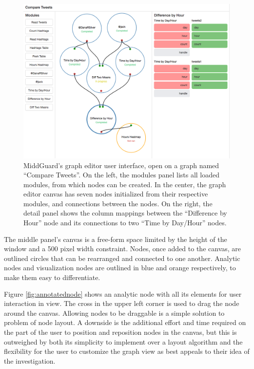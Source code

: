 \documentclass[midd]{thesis}
\begin{document}
\begin{figure}[!ht]
  \centering
  \includegraphics[width=1\textwidth]{compare-tweets-graph-editor-no-sidebar}
  \caption[MiddGuard's graph editor user interface.]{MiddGuard's graph editor
  user interface, open on a graph named ``Compare Tweets''. On the left, the
  modules panel lists all loaded modules, from which nodes can be created. In
  the center, the graph editor canvas has seven nodes initialized from their
  respective modules, and connections between the nodes. On the right, the
  detail panel shows the column mappings between the ``Difference by Hour'' node
  and its connections to two ``Time by Day/Hour'' nodes.}
  \label{fig:grapheditor}
\end{figure}

The middle panel's canvas is a free-form space limited by the height of the
window and a 500 pixel width constraint. Nodes, once added to the canvas, are
outlined circles that can be rearranged and connected to one another. Analytic
nodes and visualization nodes are outlined in blue and orange respectively, to
make them easy to differentiate.

Figure \ref{fig:annotatednode} shows an analytic node with all its elements for
user interaction in view. The cross in the upper left corner is used to drag the
node around the canvas. Allowing nodes to be draggable is a simple solution to
problem of node layout. A downside is the additional effort and time required on
the part of the user to position and reposition nodes in the canvas, but this is
outweighed by both its simplicity to implement over a layout algorithm and the
flexibility for the user to customize the graph view as best appeals to their
idea of the investigation.
\end{document}

